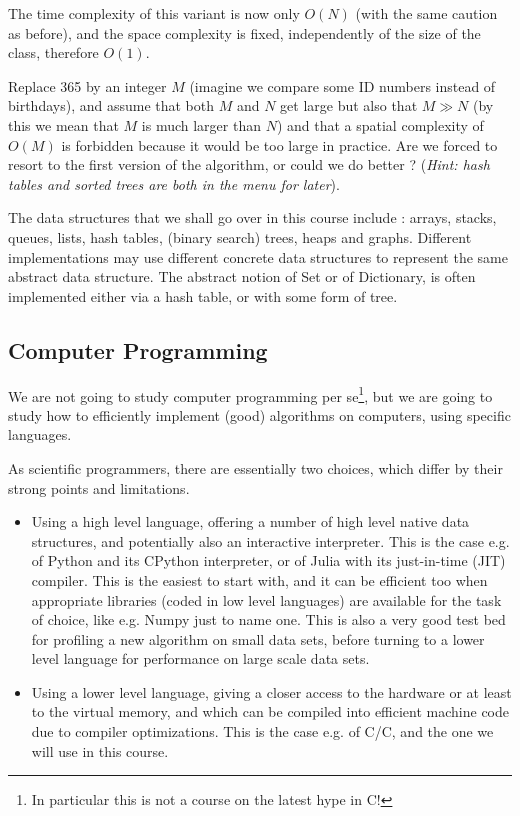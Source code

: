 \documentclass[12pt]{article}
\theoremstyle{plain}
\theoremstyle{remark}
\newcommand{\cpp}{C\nolinebreak\hspace{-.05em}\raisebox{.4ex}{\tiny\bf +}\nolinebreak\hspace{-.10em}\raisebox{.4ex}{\tiny\bf +}}
\begin{document}
The time complexity of this variant is now only $O(N)$ (with the same caution as
before), and the space complexity is fixed, independently of the size of the
class, therefore $O(1)$.

\medskip

 Replace 365 by an integer $M$ (imagine we compare
some ID numbers instead of birthdays), and assume that both $M$ and $N$ get
large but also that $M \gg N$ (by this we mean that $M$ is much larger than $N$)
and that a spatial complexity of $O(M)$ is forbidden because it would be too
large in practice. Are we forced to resort to the first version of the
algorithm, or could we do better ? ({\it Hint: hash tables and sorted trees are both in the
menu for later}).

\bigskip

The data structures that we shall go over in this course include : arrays,
stacks, queues, lists, hash tables, (binary search) trees, heaps and graphs.
Different implementations may use different concrete data structures to 
represent the same abstract data structure. The abstract notion of Set or of
Dictionary, is often implemented either via a hash table, or with some form
of tree. 

\subsection{Computer Programming}

We are not going to study computer programming per se\footnote{In particular this 
is not a course on the latest hype in \cpp !}, but we are going to study how to 
efficiently implement (good) algorithms on computers, using specific languages.

As scientific programmers, there are essentially two choices, which differ by 
their strong points and limitations.
\begin{itemize}
\item Using a high level language, offering a number of high level native data
structures, and potentially also an interactive interpreter. This is the case
e.g. of Python and its CPython interpreter, or of Julia with its 
just-in-time (JIT) compiler. This is the easiest to start with, 
and it can be efficient too when appropriate libraries (coded in low level
languages) are available for the task of choice, like e.g. Numpy just to name
one. This is also a very good test bed for profiling a new algorithm on small
data sets, before turning to a lower level language for performance on large 
scale data sets.
\item Using a lower level language, giving a closer access to the hardware or
at least to the virtual memory, and which can be compiled into efficient machine
code due to compiler optimizations. This is the case e.g. of C/\cpp, and the
one we will use in this course.
\end{itemize}
\end{document}
